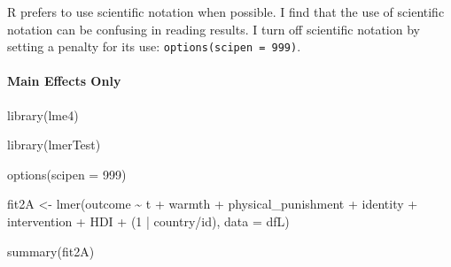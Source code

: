 \documentclass[
  letterpaper,
  DIV=11,
  numbers=noendperiod]{scrreprt}
\let\oldparagraph\paragraph
\renewcommand{\paragraph}[1]{\oldparagraph{#1}\mbox{}}
\newenvironment{Shaded}{\begin{snugshade}}{\end{snugshade}}
\newcommand{\AttributeTok}[1]{\textcolor[rgb]{0.40,0.45,0.13}{#1}}
\newcommand{\DecValTok}[1]{\textcolor[rgb]{0.68,0.00,0.00}{#1}}
\newcommand{\FunctionTok}[1]{\textcolor[rgb]{0.28,0.35,0.67}{#1}}
\newcommand{\NormalTok}[1]{\textcolor[rgb]{0.00,0.23,0.31}{#1}}
\newcommand{\OtherTok}[1]{\textcolor[rgb]{0.00,0.23,0.31}{#1}}
\newcommand{\SpecialCharTok}[1]{\textcolor[rgb]{0.37,0.37,0.37}{#1}}
\begin{document}
\begin{tcolorbox}[enhanced jigsaw, bottomtitle=1mm, opacitybacktitle=0.6, title=\textcolor{quarto-callout-tip-color}{\faLightbulb}\hspace{0.5em}{Tip}, opacityback=0, titlerule=0mm, toprule=.15mm, breakable, colframe=quarto-callout-tip-color-frame, rightrule=.15mm, coltitle=black, colback=white, toptitle=1mm, arc=.35mm, left=2mm, leftrule=.75mm, bottomrule=.15mm, colbacktitle=quarto-callout-tip-color!10!white]

R prefers to use scientific notation when possible. I find that the use
of scientific notation can be confusing in reading results. I turn off
scientific notation by setting a penalty for its use:
\texttt{options(scipen\ =\ 999)}.

\end{tcolorbox}

\paragraph{Main Effects Only}\label{main-effects-only-1}

\begin{Shaded}
\begin{Highlighting}[]
\FunctionTok{library}\NormalTok{(lme4) }

\FunctionTok{library}\NormalTok{(lmerTest)}

\FunctionTok{options}\NormalTok{(}\AttributeTok{scipen =} \DecValTok{999}\NormalTok{) }

\NormalTok{fit2A }\OtherTok{\textless{}{-}} \FunctionTok{lmer}\NormalTok{(outcome }\SpecialCharTok{\textasciitilde{}}\NormalTok{ t }\SpecialCharTok{+}\NormalTok{ warmth }\SpecialCharTok{+}\NormalTok{ physical\_punishment }\SpecialCharTok{+} 
\NormalTok{               identity }\SpecialCharTok{+}\NormalTok{ intervention }\SpecialCharTok{+}\NormalTok{ HDI }\SpecialCharTok{+}
\NormalTok{               (}\DecValTok{1} \SpecialCharTok{|}\NormalTok{ country}\SpecialCharTok{/}\NormalTok{id),}
             \AttributeTok{data =}\NormalTok{ dfL)}

\FunctionTok{summary}\NormalTok{(fit2A)}
\end{Highlighting}
\end{Shaded}
\end{document}
